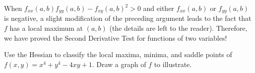 When $f_{xx}(a,b)f_{yy}(a,b)-f_{xy}(a,b)^2>0$ and either $f_{xx}(a,b)$ or $f_{yy}(a,b)$ is negative, a slight modification of the preceding argument
leads to the fact that $f$ has a local maximum at $(a,b)$ (the details are left to the reader). Therefore, we have proved the Second Derivative Test for functions of two variables!



\begin{pactivity} Use the Hessian to classify the local maxima, minima, and saddle points of $f(x,y)=x^4+y^4-4xy+1$. Draw a graph of $f$ to illustrate. 


\end{pactivity}


